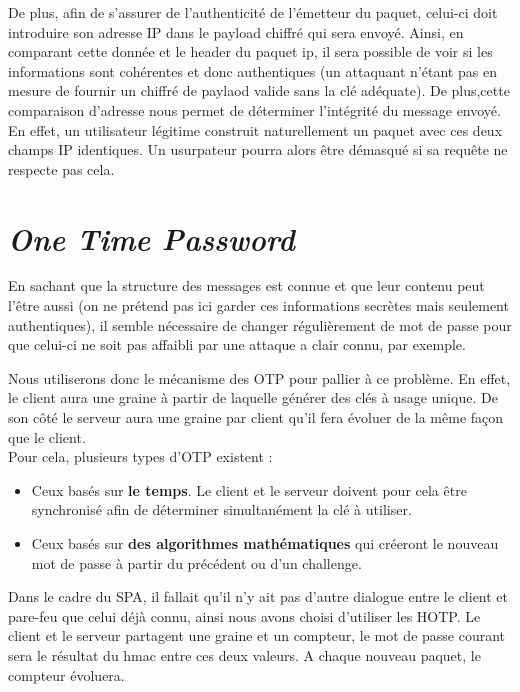 De plus, afin de s'assurer de l'authenticité de l'émetteur du paquet, celui-ci doit introduire son adresse IP dans le payload chiffré qui sera envoyé. Ainsi, en comparant cette donnée et le header du paquet ip, il sera possible de voir si les informations sont cohérentes et donc authentiques (un attaquant n'étant pas en mesure de fournir un chiffré de paylaod valide sans la clé adéquate). 
De plus,cette comparaison d'adresse nous permet de déterminer l'intégrité du message envoyé.
En effet, un utilisateur légitime construit naturellement un paquet avec ces deux champs IP identiques. Un usurpateur pourra alors être démasqué si sa requête ne respecte pas cela.

\section{\emph{\textbf{O}ne \textbf{T}ime \textbf{P}assword}}
En sachant que la structure des messages est connue et que leur contenu peut l'être aussi (on ne prétend pas ici garder ces informations secrètes mais seulement authentiques), il semble nécessaire de changer régulièrement de mot de passe pour que celui-ci ne soit pas affaibli par une attaque a clair connu, par exemple.

Nous utiliserons donc le mécanisme des OTP pour pallier à ce problème. En effet, le client aura une graine à partir de laquelle générer des clés à usage unique. De son côté le serveur aura une graine par client qu'il fera évoluer de la même façon que le client.
\\
Pour cela, plusieurs types d'OTP existent :
\begin{itemize}
\item Ceux basés sur \textbf{le temps}. Le client et le serveur doivent pour cela être synchronisé afin de déterminer simultanément la clé à utiliser.  
\item Ceux basés sur \textbf{des algorithmes mathématiques} qui créeront le nouveau mot de passe à partir du précédent ou d'un challenge.
\end{itemize}
Dans le cadre du SPA, il fallait qu'il n'y ait pas d'autre dialogue entre le client et pare-feu que celui déjà connu, ainsi nous avons choisi d'utiliser les HOTP. Le client et le serveur partagent une graine et un compteur, le mot de passe courant sera le résultat du hmac entre ces deux valeurs. A chaque nouveau paquet, le compteur évoluera.
